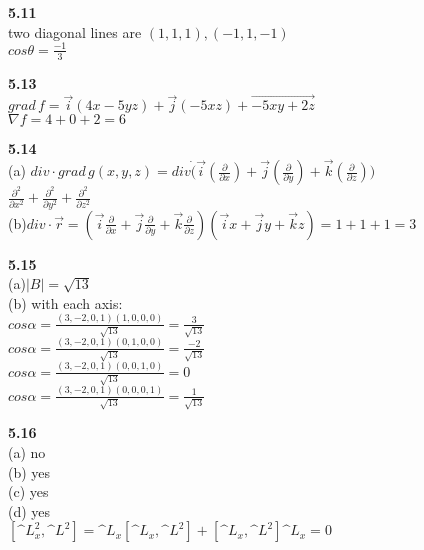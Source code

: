 \documentclass{article}
\begin{document}
\textbf{5.11}\\
two diagonal lines are $(1,1,1),(-1,1,-1)$\\
$cos\theta = \frac{-1}{3}$\\
\newline

\textbf{5.13}\\
$grad\, f = \overrightarrow{i}(4x-5yz)+\overrightarrow{j}(-5xz)+\overrightarrow{-5xy+2z}$\\
$\nabla f = 4+0+2 = 6$\\
\newline

\textbf{5.14}\\
(a) $div\cdot grad\, g(x,y,z) = div \dot (\overrightarrow{i}(\frac{\partial}{\partial x})+\overrightarrow{j}(\frac{\partial}{\partial y})+\overrightarrow{k}(\frac{\partial}{\partial z}))$\\
$\frac{\partial^2}{\partial x^2} + \frac{\partial^2}{\partial y^2} + \frac{\partial^2}{\partial z^2}$\\
(b)$div \cdot \overrightarrow{r} = (\overrightarrow{i}\frac{\partial}{\partial x} + \overrightarrow{j}\frac{\partial}{\partial y} + \overrightarrow{k}\frac{\partial}{\partial z})(\overrightarrow{i}x + \overrightarrow{j}y + \overrightarrow{k}z) = 1+1+1 = 3$\\
\newline

\textbf{5.15}\\
(a)$|B| = \sqrt{13}$\\
(b) with each axis:\\
$cos\alpha = \frac{(3,-2,0,1)(1,0,0,0)}{\sqrt{13}} = \frac{3}{\sqrt{13}}$\\
$cos\alpha = \frac{(3,-2,0,1)(0,1,0,0)}{\sqrt{13}} = \frac{-2}{\sqrt{13}}$\\
$cos\alpha = \frac{(3,-2,0,1)(0,0,1,0)}{\sqrt{13}} = 0$\\
$cos\alpha = \frac{(3,-2,0,1)(0,0,0,1)}{\sqrt{13}} = \frac{1}{\sqrt{13}}$\\
\newline

\textbf{5.16}\\
(a) no\\
(b) yes\\
(c) yes\\
(d) yes\\
$[\^{L}_x^2,\^{L}^2] = \^{L}_x[\^{L}_x,\^{L}^2] + [\^{L}_x,\^{L}^2]\^{L}_x = 0$\\
\newline
\end{document}
